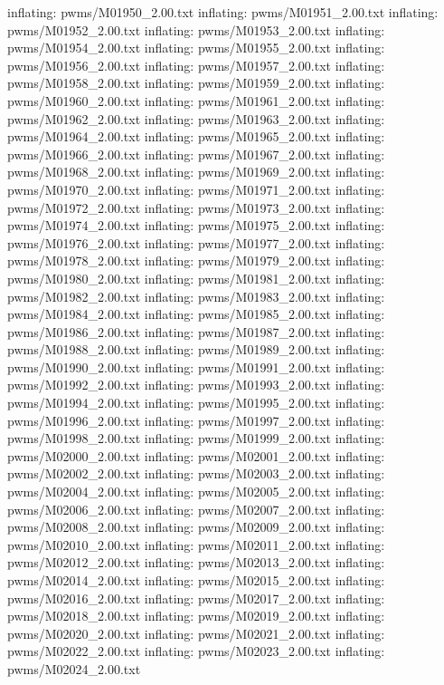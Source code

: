 \documentclass[letterpaper,10pt,english]{sphinxmanual}
\begin{document}
{\begin{sphinxVerbatim}[commandchars=\\\{\}]
  inflating: pwms/M01950\_2.00.txt
  inflating: pwms/M01951\_2.00.txt
  inflating: pwms/M01952\_2.00.txt
  inflating: pwms/M01953\_2.00.txt
  inflating: pwms/M01954\_2.00.txt
  inflating: pwms/M01955\_2.00.txt
  inflating: pwms/M01956\_2.00.txt
  inflating: pwms/M01957\_2.00.txt
  inflating: pwms/M01958\_2.00.txt
  inflating: pwms/M01959\_2.00.txt
  inflating: pwms/M01960\_2.00.txt
  inflating: pwms/M01961\_2.00.txt
  inflating: pwms/M01962\_2.00.txt
  inflating: pwms/M01963\_2.00.txt
  inflating: pwms/M01964\_2.00.txt
  inflating: pwms/M01965\_2.00.txt
  inflating: pwms/M01966\_2.00.txt
  inflating: pwms/M01967\_2.00.txt
  inflating: pwms/M01968\_2.00.txt
  inflating: pwms/M01969\_2.00.txt
  inflating: pwms/M01970\_2.00.txt
  inflating: pwms/M01971\_2.00.txt
  inflating: pwms/M01972\_2.00.txt
  inflating: pwms/M01973\_2.00.txt
  inflating: pwms/M01974\_2.00.txt
  inflating: pwms/M01975\_2.00.txt
  inflating: pwms/M01976\_2.00.txt
  inflating: pwms/M01977\_2.00.txt
  inflating: pwms/M01978\_2.00.txt
  inflating: pwms/M01979\_2.00.txt
  inflating: pwms/M01980\_2.00.txt
  inflating: pwms/M01981\_2.00.txt
  inflating: pwms/M01982\_2.00.txt
  inflating: pwms/M01983\_2.00.txt
  inflating: pwms/M01984\_2.00.txt
  inflating: pwms/M01985\_2.00.txt
  inflating: pwms/M01986\_2.00.txt
  inflating: pwms/M01987\_2.00.txt
  inflating: pwms/M01988\_2.00.txt
  inflating: pwms/M01989\_2.00.txt
  inflating: pwms/M01990\_2.00.txt
  inflating: pwms/M01991\_2.00.txt
  inflating: pwms/M01992\_2.00.txt
  inflating: pwms/M01993\_2.00.txt
  inflating: pwms/M01994\_2.00.txt
  inflating: pwms/M01995\_2.00.txt
  inflating: pwms/M01996\_2.00.txt
  inflating: pwms/M01997\_2.00.txt
  inflating: pwms/M01998\_2.00.txt
  inflating: pwms/M01999\_2.00.txt
  inflating: pwms/M02000\_2.00.txt
  inflating: pwms/M02001\_2.00.txt
  inflating: pwms/M02002\_2.00.txt
  inflating: pwms/M02003\_2.00.txt
  inflating: pwms/M02004\_2.00.txt
  inflating: pwms/M02005\_2.00.txt
  inflating: pwms/M02006\_2.00.txt
  inflating: pwms/M02007\_2.00.txt
  inflating: pwms/M02008\_2.00.txt
  inflating: pwms/M02009\_2.00.txt
  inflating: pwms/M02010\_2.00.txt
  inflating: pwms/M02011\_2.00.txt
  inflating: pwms/M02012\_2.00.txt
  inflating: pwms/M02013\_2.00.txt
  inflating: pwms/M02014\_2.00.txt
  inflating: pwms/M02015\_2.00.txt
  inflating: pwms/M02016\_2.00.txt
  inflating: pwms/M02017\_2.00.txt
  inflating: pwms/M02018\_2.00.txt
  inflating: pwms/M02019\_2.00.txt
  inflating: pwms/M02020\_2.00.txt
  inflating: pwms/M02021\_2.00.txt
  inflating: pwms/M02022\_2.00.txt
  inflating: pwms/M02023\_2.00.txt
  inflating: pwms/M02024\_2.00.txt

\end{sphinxVerbatim}}
\end{document}
